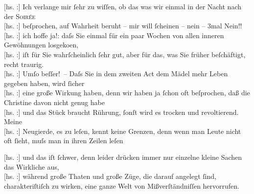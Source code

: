 \pstart
           {[}hs. :{]} Ich verlange mir ſehr zu wiſſen, ob das was wir einmal
               in der Nacht nach der \textsc{Soirée}{\\}{[}hs. :{]} beſprochen, auf Wahrheit beruht – mir will ſcheinen –
               nein – 3mal Nein!! {\\}{[}hs. :{]} ich hoffe ja!: daſs Sie einmal für ein paar Wochen von
               allen inneren Gewöhnungen losgeko{\geminationm}en, {\\}{[}hs. :{]} iſt für Sie wahrſcheinlich ſehr gut, aber \introOben{}für\introOben{} das, was Sie früher beſchäftigt, recht traurig. {\\}{[}hs. :{]} Umſo beſſer! – Daſs Sie in dem zweiten Act dem Mädel mehr Leben gegeben haben, wird ſicher {\\}{[}hs. :{]} eine große Wirkung haben, denn wir haben ja ſchon oft
               beſprochen, daß die Christine
               davon nicht genug habe {\\}{[}hs. :{]} und das Stück braucht Rührung, ſonſt wird es trocken und
               revoltierend. Meine {\\}{[}hs. :{]} Neugierde, es zu leſen, kennt keine Grenzen, denn wenn
               man Leute nicht oft ſieht, muſs man in ihren Zeilen leſen \pend
           
\pstart
           {\pb}{[}hs. :{]} und das iſt ſchwer, denn leider drücken immer nur
               einzelne kleine Sachen das Wirkliche aus, {\\}{[}hs. :{]} während große Thaten und große Züge, die darauf
               angelegt ſind, charakteriſtiſch zu wirken, eine ganze Welt von Mißverſtändniſſen
               hervorrufen.\pend
           
